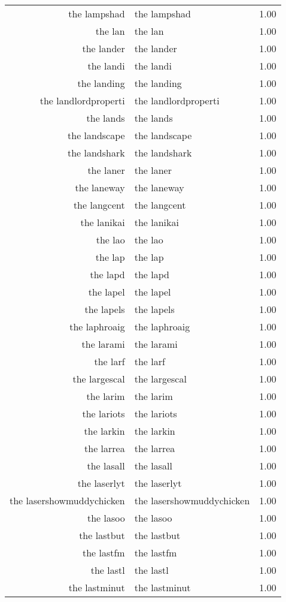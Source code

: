 \begin{table}[ht]
\begin{tabular}{rlr}
  the lampshad & the lampshad & 1.00 \\ 
  the lan & the lan & 1.00 \\ 
  the lander & the lander & 1.00 \\ 
  the landi & the landi & 1.00 \\ 
  the landing & the landing & 1.00 \\ 
  the landlordproperti & the landlordproperti & 1.00 \\ 
  the lands & the lands & 1.00 \\ 
  the landscape & the landscape & 1.00 \\ 
  the landshark & the landshark & 1.00 \\ 
  the laner & the laner & 1.00 \\ 
  the laneway & the laneway & 1.00 \\ 
  the langcent & the langcent & 1.00 \\ 
  the lanikai & the lanikai & 1.00 \\ 
  the lao & the lao & 1.00 \\ 
  the lap & the lap & 1.00 \\ 
  the lapd & the lapd & 1.00 \\ 
  the lapel & the lapel & 1.00 \\ 
  the lapels & the lapels & 1.00 \\ 
  the laphroaig & the laphroaig & 1.00 \\ 
  the larami & the larami & 1.00 \\ 
  the larf & the larf & 1.00 \\ 
  the largescal & the largescal & 1.00 \\ 
  the larim & the larim & 1.00 \\ 
  the lariots & the lariots & 1.00 \\ 
  the larkin & the larkin & 1.00 \\ 
  the larrea & the larrea & 1.00 \\ 
  the lasall & the lasall & 1.00 \\ 
  the laserlyt & the laserlyt & 1.00 \\ 
  the lasershowmuddychicken & the lasershowmuddychicken & 1.00 \\ 
  the lasoo & the lasoo & 1.00 \\ 
  the lastbut & the lastbut & 1.00 \\ 
  the lastfm & the lastfm & 1.00 \\ 
  the lastl & the lastl & 1.00 \\ 
  the lastminut & the lastminut & 1.00 \\ 

\end{tabular}
\end{table}
